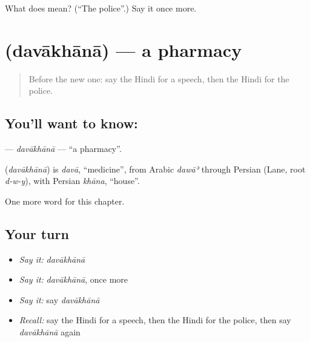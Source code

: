 \begin{tcolorbox}[breakable,colback=teal!4,colframe=teal!35!black,title={Before you move on}]
What does  mean? (\textquotedblleft{}The police\textquotedblright{}.) Say it once more.
\end{tcolorbox}
\section[\texorpdfstring{\hi{दवाख़ाना} (davākhānā)}{दवाख़ाना (davākhānā)}]{ (davākhānā) — a pharmacy}

\label{lesson:HI-C273-davakhana}



\begin{quote}
Before the new one: say the Hindi for a speech, then the Hindi for the police.
\end{quote}

\subsection*{You'll want to know: }
\textbf{} — \emph{davākhānā} — \textquotedblleft{}a pharmacy\textquotedblright{}.

\begin{cousinweb}
\textbf{} (\emph{davākhānā}) is \emph{davā}, \textquotedblleft{}medicine\textquotedblright{}, from Arabic \emph{dawāʾ} through Persian (Lane, root \emph{d-w-y}), with Persian \emph{khāna}, \textquotedblleft{}house\textquotedblright{}.
\end{cousinweb}

\begin{grammarlens}[title={What you've built}]
One more word for this chapter.
\end{grammarlens}

\subsection*{Your turn}
\begin{itemize}
\raggedright
  \item \emph{Say it:} \emph{davākhānā}
  \item \emph{Say it:} \emph{davākhānā}, once more
  \item \emph{Say it:} say \emph{davākhānā}
  \item \emph{Recall:} say the Hindi for a speech, then the Hindi for the police, then say \emph{davākhānā} again
\end{itemize}

